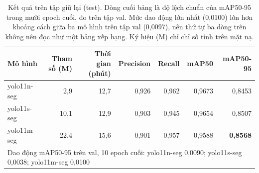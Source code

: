 \begin{table}[H]
\centering
\caption{Kết quả trên tập giữ lại (test). Dòng cuối bảng là độ lệch chuẩn của mAP50-95 trong mười epoch cuối, đo trên tập val. Mức dao động lớn nhất (0{,}0100) lớn hơn khoảng cách giữa ba mô hình trên tập val (0{,}0097), nên thứ tự ba dòng trên không nên đọc như một bảng xếp hạng. Ký hiệu (M) chỉ chỉ số tính trên mặt nạ.}
\label{tab:results}
\small
\begin{tabular}{l r r r r r r}
\toprule
Mô hình & Tham số (M) & Thời gian (phút) & Precision & Recall & mAP50 & mAP50-95 \\
\midrule
yolo11n-seg & 2{,}9 & 12{,}7 & 0{,}926 & 0{,}962 & 0{,}9673 & 0{,}8453 \\
yolo11s-seg & 10{,}1 & 12{,}9 & 0{,}903 & 0{,}945 & 0{,}9654 & 0{,}8507 \\
yolo11m-seg & 22{,}4 & 15{,}6 & 0{,}901 & 0{,}957 & 0{,}9588 & \textbf{0{,}8568} \\
\midrule
\multicolumn{7}{l}{\small Dao động mAP50-95 trên val, 10 epoch cuối: yolo11n-seg 0{,}0090; yolo11s-seg 0{,}0038; yolo11m-seg 0{,}0100} \\
\bottomrule
\end{tabular}
\end{table}
